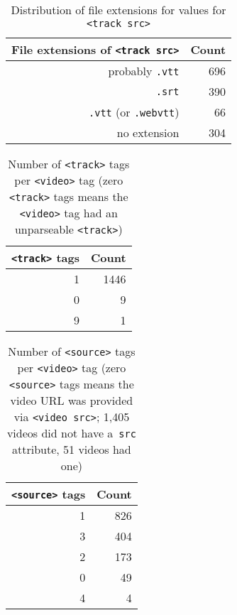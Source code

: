 \documentclass{sig-alternate}
\begin{document}
\begin{table}[p]
  \centering
  \begin{tabular}{ r | r }                       
    File extensions of \texttt{<track src>} & Count \\
    \hline
    probably \texttt{.vtt} & 696\\
    \texttt{.srt} & 390\\
    \texttt{.vtt} (or \texttt{.webvtt}) & 66\\
    no extension & 304\\
  \end{tabular}
  \caption{Distribution of file extensions for
    values for \texttt{<track src>}}
  \label{table:src}    
\end{table}

\begin{table}[p]
  \centering
  \begin{tabular}{ r | r }                       
    \texttt{<track>} tags & Count \\
    \hline
    1 & 1446\\
    0 & 9\\
    9 & 1\\
  \end{tabular}
  \caption{Number of \texttt{<track>} tags per
    \texttt{<video>} tag \tiny (zero \texttt{<track>}
    tags means  the \texttt{<video>} tag had
    an  unparseable \texttt{<track>})}
  \label{table:track}    
\end{table}

\begin{table}[p]
  \centering
  \begin{tabular}{ r | r }
    \texttt{<source>} tags & Count \\
    \hline
    1 & 826\\    
    3 & 404\\    
    2 & 173\\    
    0 & 49\\
    4 & 4\\
  \end{tabular}
  \caption{Number of \texttt{<source>} tags per
    \texttt{<video>} tag \tiny (zero \texttt{<source>}
    tags means the video URL was provided via
    \texttt{<video src>}; 1,405 videos did not have
    a~\texttt{src} attribute, 51 videos had one)}
  \label{table:source}    
\end{table}
\end{document}
